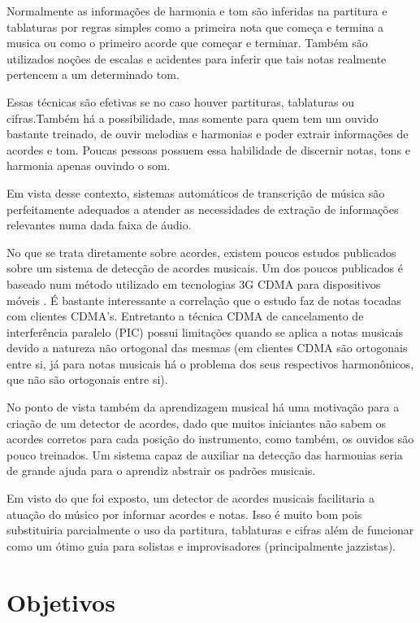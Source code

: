 Normalmente as informações de harmonia e tom são inferidas na partitura e tablaturas por regras simples como a primeira nota que começa e termina a musica ou como o primeiro acorde que começar e terminar. Também são utilizados noções de escalas e acidentes para inferir que tais notas realmente pertencem a um determinado tom.

Essas técnicas são efetivas se no caso houver partituras, tablaturas ou cifras.Também há a possibilidade, mas somente para quem tem um ouvido bastante treinado, de ouvir melodias e harmonias e poder extrair informações de acordes e tom. Poucas pessoas possuem essa habilidade de discernir notas, tons e harmonia apenas ouvindo o som.

Em vista desse contexto, sistemas automáticos de transcrição de música \cite{automaticmusic} são perfeitamente adequados a atender as necessidades de extração de informações relevantes numa dada faixa de áudio.

No que se trata diretamente sobre acordes, existem poucos estudos publicados sobre um sistema de detecção de acordes musicais. Um dos poucos publicados é baseado num método utilizado em tecnologias 3G CDMA para dispositivos móveis \cite{picchords}. É bastante interessante a correlação que o estudo faz de notas tocadas com clientes CDMA's. Entretanto a técnica CDMA de cancelamento de interferência paralelo (PIC) possui limitações quando se aplica a notas musicais devido a natureza não ortogonal das mesmas (em clientes CDMA são ortogonais entre si, já para notas musicais há o problema dos seus respectivos harmonônicos, que não são ortogonais entre si).

No ponto de vista também da aprendizagem musical há uma motivação para a criação de um detector de acordes, dado que muitos iniciantes não sabem os acordes corretos para cada posição do instrumento, como também, os ouvidos são pouco treinados. Um sistema capaz de auxiliar na detecção das harmonias seria de grande ajuda para o aprendiz abstrair os padrões musicais.

Em visto do que foi exposto, um detector de acordes musicais facilitaria a atuação do músico por informar acordes e notas. Isso é muito bom pois substituiria parcialmente o uso da partitura, tablaturas e cifras além de funcionar como um ótimo guia para solistas e improvisadores (principalmente jazzistas).

\section{Objetivos}
\label{sec:objetivos}

